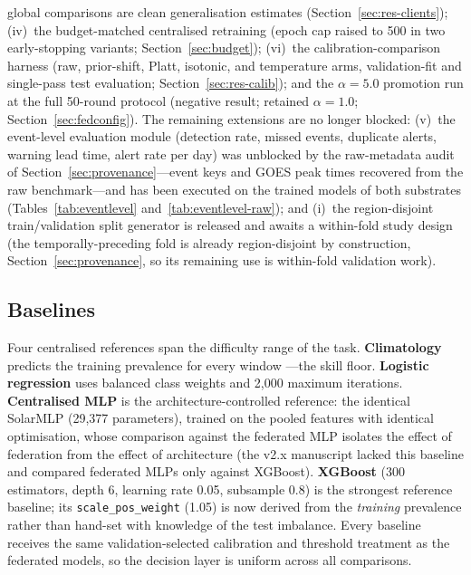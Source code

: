 \begin{itemize}[leftmargin=1.4em,itemsep=1pt]
global comparisons are clean generalisation estimates
(Section~\ref{sec:res-clients}); (iv)\ the budget-matched centralised
retraining (epoch cap raised to 500 in two early-stopping variants;
Section~\ref{sec:budget}); (vi)\ the calibration-comparison harness
(raw, prior-shift, Platt, isotonic, and temperature arms,
validation-fit and single-pass test evaluation;
Section~\ref{sec:res-calib}); and the $\alpha{=}5.0$ promotion run at
the full 50-round protocol (negative result; retained
$\alpha{=}1.0$; Section~\ref{sec:fedconfig}). The remaining
extensions are no longer blocked: (v)\ the event-level evaluation
module (detection rate, missed events, duplicate alerts, warning lead
time, alert rate per day) was unblocked by the raw-metadata audit of
Section~\ref{sec:provenance}---event keys and GOES peak times
recovered from the raw benchmark---and has been executed on the
trained models of both substrates
(Tables~\ref{tab:eventlevel} and~\ref{tab:eventlevel-raw}); and
(i)\ the region-disjoint train/validation split generator is released
and awaits a within-fold study design (the temporally-preceding fold
is already region-disjoint by construction,
Section~\ref{sec:provenance}, so its remaining use is
within-fold validation work).
\end{itemize}

\subsection{Baselines}

Four centralised references span the difficulty range of the task.
\textbf{Climatology} predicts the training prevalence for every window
---the skill floor. \textbf{Logistic regression} uses balanced class
weights and 2{,}000 maximum iterations. \textbf{Centralised MLP} is the
architecture-controlled reference: the identical SolarMLP
(29{,}377 parameters), trained on the pooled features with identical
optimisation, whose comparison against the federated MLP isolates the
effect of federation from the effect of architecture (the v2.x
manuscript lacked this baseline and compared federated MLPs only
against XGBoost). \textbf{XGBoost} \cite{chen2016} (300 estimators,
depth 6, learning rate 0.05, subsample 0.8) is the strongest reference
baseline; its \texttt{scale\_pos\_weight} (1.05) is now derived from
the \emph{training} prevalence rather than hand-set with knowledge of
the test imbalance. Every baseline receives the same
validation-selected calibration and threshold treatment as the
federated models, so the decision layer is uniform across all
comparisons.

